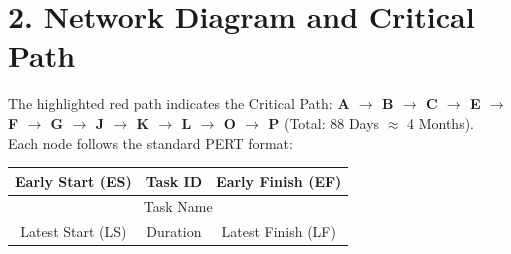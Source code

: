 \documentclass[11pt, a4paper, landscape]{article}
\begin{document}
\section*{2. Network Diagram and Critical Path}
The highlighted red path indicates the Critical Path: \textbf{A $\rightarrow$ B $\rightarrow$ C $\rightarrow$ E $\rightarrow$ F $\rightarrow$ G $\rightarrow$ J $\rightarrow$ K $\rightarrow$ L $\rightarrow$ O $\rightarrow$ P} (Total: 88 Days $\approx$ 4 Months).\\
Each node follows the standard PERT format:
\begin{center}
\begin{tabular}{|c|c|c|}
\hline
Early Start (ES) & Task ID & Early Finish (EF) \\ \hline
\multicolumn{3}{|c|}{Task Name} \\ \hline
Latest Start (LS) & Duration & Latest Finish (LF) \\ \hline
\end{tabular}
\end{center}
\end{document}

